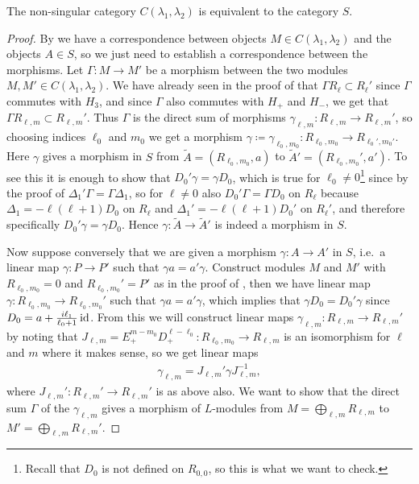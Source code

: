 \begin{theorem}\label{thm:nonsingcateq}
  The non-singular category $C(\lambda_1,\lambda_2)$ is equivalent to the category $S$.
\end{theorem}
\begin{proof}
  By  we have a correspondence between objects $M\in C(\lambda_1,\lambda_2)$ and the objects $A\in S$, so we just need to establish a correspondence between the morphisms. Let $\Gamma\colon M\to M'$ be a morphism between the two modules $M,M'\in C(\lambda_1,\lambda_2)$. We have already seen in the proof of  that $\Gamma R_\ell\subset R_\ell'$ since $\Gamma$ commutes with $H_3$, and since $\Gamma$ also commutes with $H_+$ and $H_-$, we get that $\Gamma R_{\ell,m}\subset R_{\ell,m}'$. Thus $\Gamma$ is the direct sum of morphisms $\gamma_{\ell,m}\colon R_{\ell,m}\to R_{\ell,m}'$, so choosing indices $\ell_0$ and $m_0$ we get a morphism $\gamma\coloneqq \gamma_{\ell_0,m_0}\colon R_{\ell_0,m_0}\to R_{\ell_0',m_0'}$. Here $\gamma$ gives a morphism in $S$ from $\widetilde{A}=(R_{\ell_0,m_0},a)$ to $\widetilde{A}'=(R_{\ell_0,m_0}',a')$. To see this it is enough to show that $D_0'\gamma = \gamma D_0$, which is true for $\ell_0\neq0$\footnote{Recall that $D_0$ is not defined on $R_{0,0}$, so this is what we want to check.} since by the proof of  $\Delta_1'\Gamma=\Gamma\Delta_1$, so for $\ell\neq 0$ also $D_0'\Gamma=\Gamma D_0$ on $R_\ell$ because $\Delta_1=-\ell(\ell+1)D_0$ on $R_\ell$ and $\Delta_1'=-\ell(\ell+1)D_0'$ on $R_\ell'$, and therefore specifically $D_0' \gamma = \gamma D_0$. Hence $\gamma\colon \widetilde{A}\to \widetilde{A}'$ is indeed a morphism in $S$.

  Now suppose conversely that we are given a morphism $\gamma\colon A\to A'$ in $S$, i.e.\ a linear map $\gamma\colon P\to P'$ such that $\gamma a=a'\gamma$. Construct modules $M$ and $M'$ with $R_{\ell_0,m_0}=0$ and $R_{\ell_0,m_0}'=P'$ as in the proof of , then we have linear map $\gamma\colon R_{\ell_0,m_0}\to R_{\ell_0,m_0}'$ such that $\gamma a=a'\gamma$, which implies that $\gamma D_0=D_0'\gamma$ since $D_0=a+\tfrac{i\ell_1}{\ell_0+1}\operatorname{id}$. From this we will construct linear maps $\gamma_{\ell,m}\colon R_{\ell,m}\to R_{\ell,m}'$ by noting that $J_{\ell,m}=E_+^{m-m_0}D_+^{\ell-\ell_0}\colon R_{\ell_0,m_0}\to R_{\ell,m}$ is an isomorphism for $\ell$ and $m$ where it makes sense, so we get linear maps
  \begin{align}\label{eq:tempgammalm}
    \gamma_{\ell,m} = J_{\ell,m}' \gamma J_{\ell,m}^{-1},
  \end{align}
  where $J_{\ell,m}'\colon R_{\ell,m}'\to R_{\ell,m}'$ is as above also. We want to show that the direct sum $\Gamma$ of the $\gamma_{\ell,m}$ gives a morphism of $L$-modules from $M=\bigoplus_{\ell,m} R_{\ell,m}$ to $M'=\bigoplus_{\ell,m} R_{\ell,m}'$. 


\end{proof}
